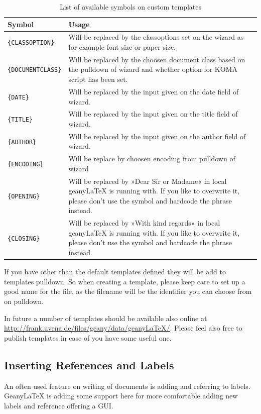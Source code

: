 \documentclass[%
a4paper,%
10pt,%
oneside,%
DIV18,
headsepline,
plainheadsepline,
footsepline,
plainfootsepline,
bibtotoc,%
liststotoc,%
BCOR12mm,%
halfparskip,%
openany,%
]{scrartcl}
\begin{document}
\begin{table}[H]
\centering
\label{tab:symbols_in_custom_templates}
\caption{List of available symbols on custom templates}
\begin{tabular}{l|p{10cm}}
\textbf{Symbol} & \textbf{Usage}\\ \hline
\texttt{\{CLASSOPTION\}} & Will be replaced by the classoptions set on 
	the wizard as for example font size or paper size.\\
\texttt{\{DOCUMENTCLASS\}} & Will be replaced by the choosen document 
	class based on the pulldown of wizard and whether option for KOMA 
	script has been set. \\
\texttt{\{DATE\}} & Will be replaced by the input given on the date 
	field of wizard.\\
\texttt{\{TITLE\}} & Will be replaced by the input given on the title 
	field of wizard.\\
\texttt{\{AUTHOR\} }& Will be replaced by the input given on the author 
	field of wizard.\\
\texttt{\{ENCODING\}} & Will be replace by choosen encoding from pulldown 
	of wizard\\
\texttt{\{OPENING\}} & Will be replaced by »Dear Sir or Madame« in local 
	geany\LaTeX{} is running with. If you like to overwrite it, please 
	don't use the symbol and hardcode the phrase instead.\\
\texttt{\{CLOSING\}} & Will be replaced by »With kind regards« in local 
	geany\LaTeX{} is running with. If you like to overwrite it, please 
	don't use the symbol and hardcode the phrase instead.\\
	\end{tabular}
\end{table}

If you have other than the default templates defined they will be 
add to templates pulldown. So when creating a template, please keep 
care to set up a good name for the file, as the filename will be 
the identifier you can choose from on pulldown. 

In future a number of templates should be available also online at 
\url{http://frank.uvena.de/files/geany/data/geanyLaTeX/}. Please 
feel also free to publish templates in case of you have some useful 
one.

\subsection{Inserting References and Labels}
An often used feature on writing of documents is adding and referring
to labels. Geany\LaTeX{} is adding some support here for more
comfortable adding new labels and reference offering a GUI.
\end{document}
